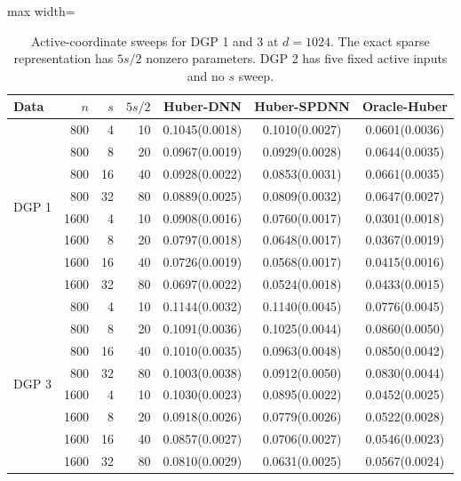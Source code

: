 \begin{table}[!ht]
\centering
\caption{Active-coordinate sweeps for DGP 1 and 3 at $d=1024$. The exact sparse representation has $5s/2$ nonzero parameters. DGP 2 has five fixed active inputs and no $s$ sweep.}
\label{tab:AC-s}
\begin{adjustbox}{max width=\linewidth}
\begin{tabular}{@{}lrrrccc@{}}
\toprule
Data & $n$ & $s$ & $5s/2$ & Huber-DNN & Huber-SPDNN & Oracle-Huber\\
\midrule
\multirow{8}{*}{DGP 1} & 800 & 4 & 10 & 0.1045(0.0018) & 0.1010(0.0027) & 0.0601(0.0036)\\
 & 800 & 8 & 20 & 0.0967(0.0019) & 0.0929(0.0028) & 0.0644(0.0035)\\
 & 800 & 16 & 40 & 0.0928(0.0022) & 0.0853(0.0031) & 0.0661(0.0035)\\
 & 800 & 32 & 80 & 0.0889(0.0025) & 0.0809(0.0032) & 0.0647(0.0027)\\
 & 1600 & 4 & 10 & 0.0908(0.0016) & 0.0760(0.0017) & 0.0301(0.0018)\\
 & 1600 & 8 & 20 & 0.0797(0.0018) & 0.0648(0.0017) & 0.0367(0.0019)\\
 & 1600 & 16 & 40 & 0.0726(0.0019) & 0.0568(0.0017) & 0.0415(0.0016)\\
 & 1600 & 32 & 80 & 0.0697(0.0022) & 0.0524(0.0018) & 0.0433(0.0015)\\
\midrule
\multirow{8}{*}{DGP 3} & 800 & 4 & 10 & 0.1144(0.0032) & 0.1140(0.0045) & 0.0776(0.0045)\\
 & 800 & 8 & 20 & 0.1091(0.0036) & 0.1025(0.0044) & 0.0860(0.0050)\\
 & 800 & 16 & 40 & 0.1010(0.0035) & 0.0963(0.0048) & 0.0850(0.0042)\\
 & 800 & 32 & 80 & 0.1003(0.0038) & 0.0912(0.0050) & 0.0830(0.0044)\\
 & 1600 & 4 & 10 & 0.1030(0.0023) & 0.0895(0.0022) & 0.0452(0.0025)\\
 & 1600 & 8 & 20 & 0.0918(0.0026) & 0.0779(0.0026) & 0.0522(0.0028)\\
 & 1600 & 16 & 40 & 0.0857(0.0027) & 0.0706(0.0027) & 0.0546(0.0023)\\
 & 1600 & 32 & 80 & 0.0810(0.0029) & 0.0631(0.0025) & 0.0567(0.0024)\\
\bottomrule
\end{tabular}
\end{adjustbox}
\end{table}

